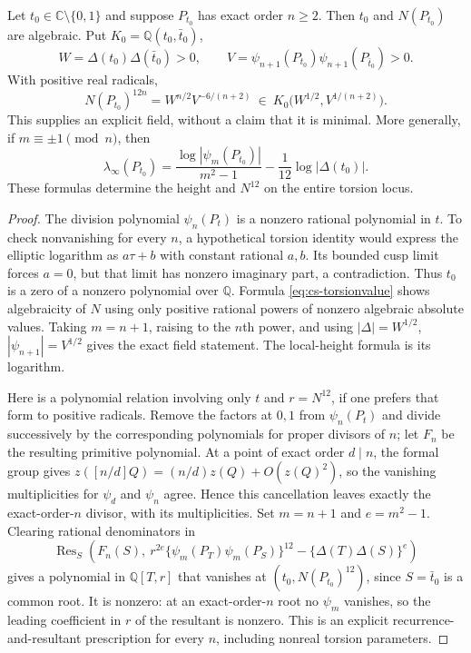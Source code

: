 \begin{statement}
Let $t_0\in\mathbb C\setminus\{0,1\}$ and suppose $P_{t_0}$ has
exact order $n\ge2$. Then $t_0$ and $N(P_{t_0})$ are algebraic.
Put $K_0=\mathbb Q(t_0,\bar t_0)$,
\[
 W=\Delta(t_0)\Delta(\bar t_0)>0,\qquad
 V=\psi_{n+1}(P_{t_0})\psi_{n+1}(P_{\bar t_0})>0.
\]
With positive real radicals,
\[
 N(P_{t_0})^{12n}=W^{n/2}V^{-6/(n+2)}
 \ \in\ K_0\bigl(W^{1/2},V^{1/(n+2)}\bigr).
\]
This supplies an explicit field, without a claim that it is minimal.
More generally, if $m\equiv\pm1\pmod n$, then
\[
 \lambda_\infty(P_{t_0})
 =\frac{\log|\psi_m(P_{t_0})|}{m^2-1}
       -\frac1{12}\log|\Delta(t_0)|.
\]
These formulas determine the height and $N^{12}$ on the entire
torsion locus.
\end{statement}
\begin{proof}
The division polynomial $\psi_n(P_t)$ is a nonzero rational
polynomial in $t$. To check nonvanishing for every $n$, a hypothetical
torsion identity would express the elliptic logarithm as
$a\tau+b$ with constant rational $a,b$. Its bounded cusp limit
forces $a=0$, but that limit has nonzero imaginary part, a
contradiction. Thus $t_0$ is a zero of a nonzero polynomial over
$\mathbb Q$. Formula \eqref{eq:cs-torsionvalue} shows algebraicity
of $N$ using only positive rational powers of nonzero algebraic
absolute values. Taking $m=n+1$, raising to the $n$th power, and
using $|\Delta|=W^{1/2}$, $|\psi_{n+1}|=V^{1/2}$ gives the exact
field statement. The local-height formula is its logarithm.

Here is a polynomial relation involving only $t$ and $r=N^{12}$,
if one prefers that form to positive radicals. Remove the factors
at $0,1$ from $\psi_n(P_t)$ and divide successively by the
corresponding polynomials for proper divisors of $n$; let $F_n$ be
the resulting primitive polynomial. At a point of exact order
$d\mid n$, the formal group gives
$z([n/d]Q)=(n/d)z(Q)+O(z(Q)^2)$, so the vanishing multiplicities for
$\psi_d$ and $\psi_n$ agree. Hence this cancellation leaves exactly
the exact-order-$n$ divisor, with its multiplicities. Set
$m=n+1$ and $e=m^2-1$. Clearing rational denominators in
\[
 \operatorname{Res}_S\left(
 F_n(S),\
 r^{2e}\{\psi_m(P_T)\psi_m(P_S)\}^{12}
              -\{\Delta(T)\Delta(S)\}^{e}\right)
\]
gives a polynomial in $\mathbb Q[T,r]$ that vanishes at
$(t_0,N(P_{t_0})^{12})$, since $S=\bar t_0$ is a common root.
It is nonzero: at an exact-order-$n$ root no $\psi_m$ vanishes,
so the leading coefficient in $r$ of the resultant is nonzero.
This is an explicit recurrence-and-resultant prescription for
every $n$, including nonreal torsion parameters.
\end{proof}

